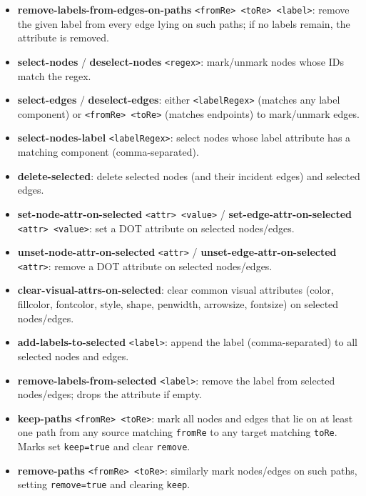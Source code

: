 \documentclass[11pt]{article}
\begin{document}
\begin{itemize}[leftmargin=*]
        \texttt{fromRe} to targets matching \texttt{toRe}.
  \item \textbf{remove-labels-from-edges-on-paths} \texttt{<fromRe> <toRe> <label>}:
        remove the given label from every edge lying on such paths; if
        no labels remain, the attribute is removed.
  \item \textbf{select-nodes} / \textbf{deselect-nodes} \texttt{<regex>}:
        mark/unmark nodes whose IDs match the regex.
  \item \textbf{select-edges} / \textbf{deselect-edges}:
        either \texttt{<labelRegex>} (matches any label component) or
        \texttt{<fromRe> <toRe>} (matches endpoints) to mark/unmark edges.
  \item \textbf{select-nodes-label} \texttt{<labelRegex>}: select nodes
        whose label attribute has a matching component (comma-separated).
  \item \textbf{delete-selected}: delete selected nodes (and their
        incident edges) and selected edges.
  \item \textbf{set-node-attr-on-selected} \texttt{<attr> <value>} /
        \textbf{set-edge-attr-on-selected} \texttt{<attr> <value>}:
        set a DOT attribute on selected nodes/edges.
  \item \textbf{unset-node-attr-on-selected} \texttt{<attr>} /
        \textbf{unset-edge-attr-on-selected} \texttt{<attr>}:
        remove a DOT attribute on selected nodes/edges.
  \item \textbf{clear-visual-attrs-on-selected}: clear common visual
        attributes (color, fillcolor, fontcolor, style, shape,
        penwidth, arrowsize, fontsize) on selected nodes/edges.
  \item \textbf{add-labels-to-selected} \texttt{<label>}: append the
        label (comma-separated) to all selected nodes and edges.
  \item \textbf{remove-labels-from-selected} \texttt{<label>}: remove
        the label from selected nodes/edges; drops the attribute if empty.
  \item \textbf{keep-paths} \texttt{<fromRe> <toRe>}: mark all nodes
        and edges that lie on at least one path from any source
        matching \texttt{fromRe} to any target matching \texttt{toRe}.
        Marks set \texttt{keep=true} and clear \texttt{remove}.
  \item \textbf{remove-paths} \texttt{<fromRe> <toRe>}: similarly mark
        nodes/edges on such paths, setting \texttt{remove=true} and
        clearing \texttt{keep}.

\end{itemize}
\end{document}
